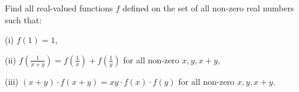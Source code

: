 Find all real-valued functions $f$ defined on the set of all non-zero real numbers such that:

(i) $f(1)=1$, 

(ii) $f\left(\frac{1}{x+y}\right)=f\left(\frac{1}{x}\right)+f\left(\frac{1}{y}\right)$ for all non-zero $x,y,x+y$, 

(iii) $(x+y)\cdot f(x+y)=xy\cdot f(x)\cdot f(y)$ for all non-zero $x,y,x+y$.
